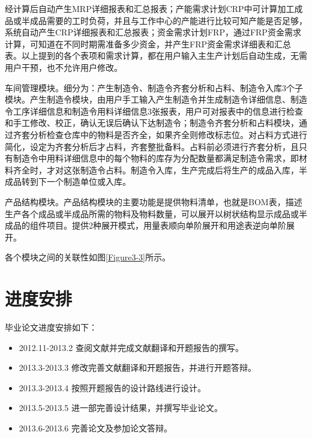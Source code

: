 \documentclass{Proposal}
\begin{document}
经计算后自动产生MRP详细报表和汇总报表；产能需求计划CRP中可计算加工成品或半成品需要的工时负荷，并且与工作中心的产能进行比较可知产能是否足够，系统自动产生CRP详细报表和汇总报表；资金需求计划FRP，通过FRP资金需求计算，可知道在不同时期需准备多少资金，并产生FRP资金需求详细表和汇总表。以上提到的各个表项和需求计算，都在用户输入主生产计划后自动生成，无需用户干预，也不允许用户修改。

车间管理模块。细分为：产生制造令、制造令齐套分析和占料、制造令入库3个子模块。产生制造令模块，由用户手工输入产生制造令并生成制造令详细信息、制造令工序详细信息和制造令用料详细信息3张报表，用户可对报表中的信息进行检查和手工修改、校正，确认无误后确认下达制造令；制造令齐套分析和占料模块，通过齐套分析检查仓库中的物料是否齐全，如果齐全则修改标志位。对占料方式进行简化，设定为齐套分析后才占料，齐套整批备料。占料前必须进行齐套分析，且只有制造令中用料详细信息中的每个物料的库存为分配数量都满足制造令需求，即材料齐全时，才对这张制造令占料。制造令入库，生产完成后将生产的成品入库，半成品转到下一个制造单位或入库。

产品结构模块。产品结构模块的主要功能是提供物料清单，也就是BOM表，描述生产各个成品或半成品所需的物料及物料数量，可以展开以树状结构显示成品或半成品的组件项目。提供2种展开模式，用量表顺向单阶展开和用途表逆向单阶展开。

各个模块之间的关联性如图\ref{Figure3-3}所示。



\section{进度安排}

毕业论文进度安排如下：
\begin{itemize}
\item 2012.11-2013.2 查阅文献并完成文献翻译和开题报告的撰写。
\item 2013.3-2013.3 修改完善文献翻译和开题报告，并进行开题答辩。
\item 2013.3-2013.4 按照开题报告的设计路线进行设计。
\item 2013.5-2013.5 进一部完善设计结果，并撰写毕业论文。
\item 2013.6-2013.6 完善论文及参加论文答辩。
\end{itemize}

\clearpage
\nocite{1}
\nocite{2}
\nocite{3}
\nocite{4}
\nocite{5}
\nocite{6}
\nocite{7}
\nocite{8}
\nocite{9}

\end{document}
